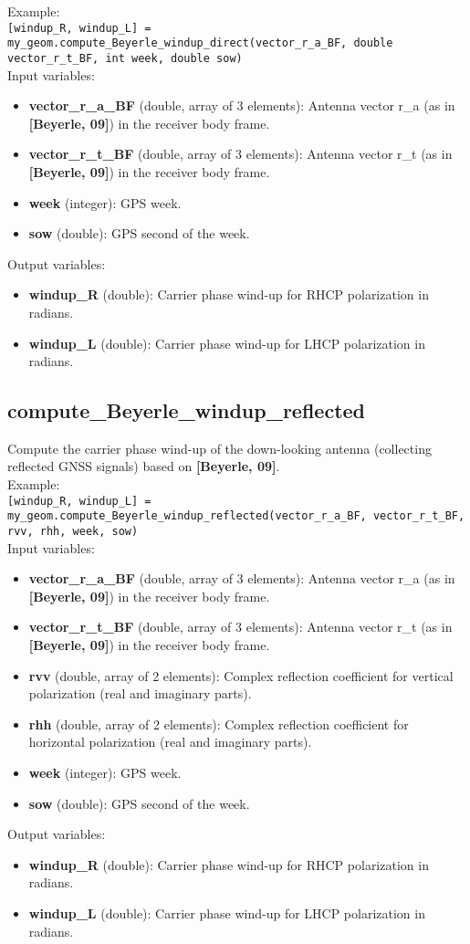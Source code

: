 Example:\\

\texttt{[windup\_R, windup\_L] = my\_geom.compute\_Beyerle\_windup\_direct(vector\_r\_a\_BF, double vector\_r\_t\_BF, int week, double sow)}\\

Input variables:
\begin{itemize}
\item {\bf vector\_r\_a\_BF} (double, array of 3 elements): Antenna vector r\_a (as in {\bf [Beyerle, 09]}) in the receiver body frame.
\item {\bf vector\_r\_t\_BF} (double, array of 3 elements): Antenna vector r\_t (as in {\bf [Beyerle, 09]}) in the receiver body frame.
\item {\bf week} (integer): GPS week.
\item {\bf sow} (double): GPS second of the week.
\end{itemize}

Output variables:
\begin{itemize}
\item {\bf windup\_R} (double): Carrier phase wind-up for RHCP polarization in radians.
\item {\bf windup\_L} (double): Carrier phase wind-up for LHCP polarization in radians.
\end{itemize}


\subsection{compute\_Beyerle\_windup\_reflected}

Compute the carrier phase wind-up of the down-looking antenna (collecting reflected GNSS signals) based on {\bf [Beyerle, 09]}.\\

Example:\\

\texttt{[windup\_R, windup\_L] = my\_geom.compute\_Beyerle\_windup\_reflected(vector\_r\_a\_BF, vector\_r\_t\_BF, rvv, rhh, week, sow)}\\

Input variables:
\begin{itemize}
\item {\bf vector\_r\_a\_BF} (double, array of 3 elements): Antenna vector r\_a (as in {\bf [Beyerle, 09]}) in the receiver body frame.
\item {\bf vector\_r\_t\_BF} (double, array of 3 elements): Antenna vector r\_t (as in {\bf [Beyerle, 09]}) in the receiver body frame.
\item {\bf rvv} (double, array of 2 elements): Complex reflection coefficient for vertical polarization (real and imaginary parts).
\item {\bf rhh} (double, array of 2 elements): Complex reflection coefficient for horizontal polarization (real and imaginary parts).
\item {\bf week} (integer): GPS week.
\item {\bf sow} (double): GPS second of the week.
\end{itemize}

Output variables:
\begin{itemize}
\item {\bf windup\_R} (double): Carrier phase wind-up for RHCP polarization in radians.
\item {\bf windup\_L} (double): Carrier phase wind-up for LHCP polarization in radians.
\end{itemize}

